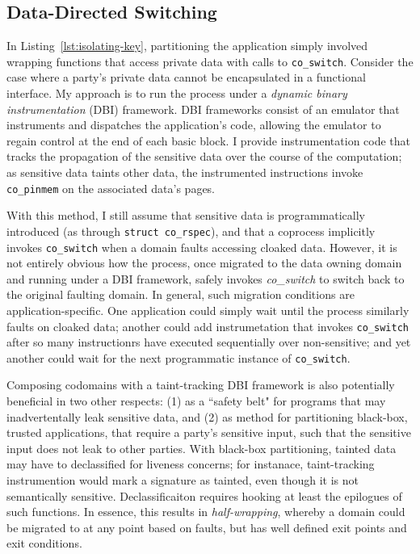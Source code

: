 \subsection{Data-Directed Switching}
\label{sec:data-directed-switching}

In Listing~\ref{lst:isolating-key}, partitioning the application simply
involved wrapping functions that access private data with calls to
\texttt{co\_switch}.
%
Consider the case where a party's private data cannot be encapsulated in a
functional interface.
%
My approach is to run the process under a \emph{dynamic binary
instrumentation} (DBI) framework.
%
DBI frameworks consist of an emulator that instruments and dispatches the
application's code, allowing the emulator to regain control at the end of each
basic block.
%
I provide instrumentation code that tracks the propagation of the sensitive
data over the course of the computation; as sensitive data taints other data,
the instrumented instructions invoke \texttt{co\_pinmem} on the associated
data's pages.


With this  method, I still assume that sensitive data is programmatically
introduced (as through \texttt{struct co\_rspec}), and that a coprocess
implicitly invokes \texttt{co\_switch} when a domain faults accessing cloaked
data.
%
However, it is not entirely obvious how the process, once migrated to the data
owning domain and running under a DBI framework, safely invokes
\emph{co\_switch} to switch back to the original faulting domain.
%
In general, such migration conditions are application-specific.
%
One application could simply wait until the process similarly faults on
cloaked data; another could add instrumetation that invokes
\texttt{co\_switch} after so many instructionrs have executed sequentially over
non-sensitive; and yet another could wait for the next programmatic instance of
\texttt{co\_switch}.


Composing codomains with a taint-tracking DBI framework is also potentially
beneficial in two other respects: (1) as a ``safety belt" for programs
that may inadvertentally leak sensitive data, and (2) as method for
partitioning black-box, trusted applications, that require a party's sensitive
input, such that the sensitive input does not leak to other parties.
%
With black-box partitioning, tainted data may have to declassified for liveness
concerns; for instanace, taint-tracking instrumention would mark a signature as
tainted, even though it is not semantically sensitive.
%
Declassificaiton requires hooking at least the epilogues of such functions.
%
In essence, this results in \emph{half-wrapping}, whereby a domain could be
migrated to at any point based on faults, but has well defined exit points and
exit conditions.







